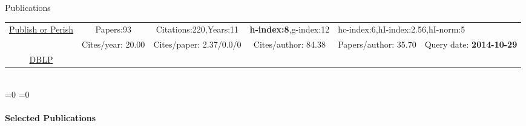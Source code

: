 \begin{rubrique}{Publications}

    {\footnotesize

      \begin{tabular}{|c||ccccc|}
        \hline
        \multirow{2}{4em}{\href{http://www.harzing.com/pop.htm}{Publish or Perish}} &
        Papers:93    & Citations:220,Years:11     & \textbf{h-index:8},g-index:12 &
        \multicolumn{2}{l|}{hc-index:6,hI-index:2.56,hI-norm:5}
        \\
        &Cites/year: 20.00 & Cites/paper: 2.37/0.0/0  & Cites/author: 84.38 &
        Papers/author: 35.70 & Query date: \textbf{2014-10-29}
        \\
        \hline
        \href{http://www.informatik.uni-trier.de/~ley/pers/hd/v/Varrette:S=eacute=bastien.html}{DBLP}\\
        \cline{1-1}
      \end{tabular}
    }
    ~\\[2em]

    \ifnum\pdfstrcmp{\cvtype}{\cvtiny}=0%
    \else
    \ifnum\pdfstrcmp{\cvtype}{\cvfull}=0%



    \else
    \vspace{-1em}
    \paragraph{Selected Publications}~\\

    \fi
    \fi
    
\end{rubrique}





% 
